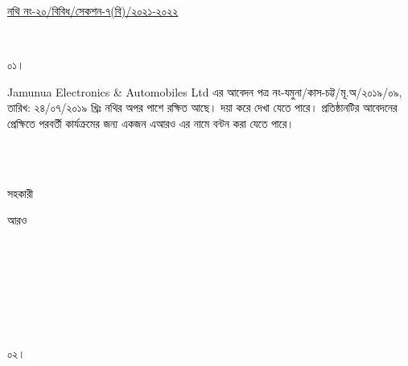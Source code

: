 \documentclass[12pt]{article}
\begin{document}
\begin{minipage}[t]{0.59\linewidth}
\hspace{0.5em}
\end{minipage}
\begin{minipage}[t]{1\textwidth}
\underline{নথি নং-২০/বিবিধ/সেকশন-৭(বি)/২০২১-২০২২}
\end{minipage}
\\
\begin{minipage}[t]{0.05\linewidth}
০১।
\end{minipage}
\begin{minipage}[t]{1\linewidth}
Jamunua Electronics \& Automobiles Ltd
এর আবেদন পত্র নং-যমুনা/কাস-চট্ট/মূ.অ/২০১৯/০৯,
তারিখ: ২৪/০৭/২০১৯ খ্রিঃ নথির অপর পাশে রক্ষিত আছে।
দয়া করে দেখা যেতে পারে।
প্রতিষ্ঠানটির আবেদনের প্রেক্ষিতে পরবর্তী কার্যক্রমের জন্য একজন এআরও
এর নামে বন্টন করা যেতে পারে।
\end{minipage}
\\
\\
\begin{minipage}[t]{0.05\linewidth}
\hspace{1em}
\end{minipage}
\begin{minipage}[t]{.5\linewidth}
সহকারী
\end{minipage}
\begin{minipage}[t]{1\linewidth}
আরও
\end{minipage}
\\
\\
\\
\\
\\
\\
\begin{minipage}[t]{0.05\linewidth}
০২।
\end{minipage}
\end{document}
